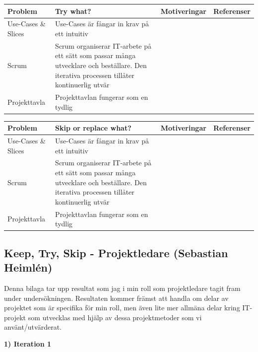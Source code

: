 \documentclass[conference,a4paper]{IEEEtran}
\newcommand\Tstrut{\rule{0pt}{2.6ex}}       %
\newcommand\Bstrut{\rule[-0.9ex]{0pt}{0pt}} %
\newcommand{\TBstrut}{\Tstrut\Bstrut} %
\begin{document}
\begin{table}[H]
	\small
  \centering
	\begin{tabular}{|p{1.5cm}|p{2cm}|p{1.8cm}|p{1.5cm}|} %
    \hline
    Problem & Try what? & Motiveringar & Referenser \TBstrut \\
    \hline
    Use-Cases \& Slices & Use-Cases är fångar in krav på ett intuitiv & & \TBstrut \\
    \hline
    Scrum & Scrum organiserar IT-arbete på ett sätt som passar många utvecklare och beställare. Den iterativa processen tillåter kontinuerlig utvär & & \TBstrut \\
    \hline
    Projekttavla & Projekttavlan fungerar som en tydlig & & \TBstrut \\
    \hline
  \end{tabular}
\end{table}

\begin{table}[H]
	\small
  \centering
	\begin{tabular}{|p{1.5cm}|p{2cm}|p{1.8cm}|p{1.5cm}|} %
    \hline
    Problem & Skip or replace what? & Motiveringar & Referenser \TBstrut \\
    \hline
    Use-Cases \& Slices & Use-Cases är fångar in krav på ett intuitiv & & \TBstrut \\
    \hline
    Scrum & Scrum organiserar IT-arbete på ett sätt som passar många utvecklare och beställare. Den iterativa processen tillåter kontinuerlig utvär & & \TBstrut \\
    \hline
    Projekttavla & Projekttavlan fungerar som en tydlig & & \TBstrut \\
    \hline
  \end{tabular}
\end{table}

\subsection{Keep, Try, Skip - Projektledare (Sebastian Heimlén)}

Denna bilaga tar upp resultat som jag i min roll som projektledare tagit fram under undersökningen. Resultaten kommer främst att handla om delar av projektet som är specifika för min roll, men även lite mer allmäna delar kring IT-projekt som utvecklas med hjälp av dessa projektmetoder som vi använt/utvärderat.

\textbf{1) Iteration 1}
\end{document}
